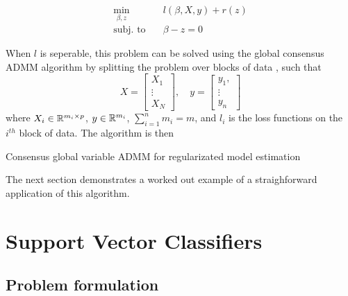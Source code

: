 \documentclass[11pt]{article}
\begin{document}
\begin{equation}
\begin{aligned}
    \min_{\beta, z} \quad & {l(\beta, X, y) + r(z)} \\
    \textrm{subj. to} \quad & \beta - z = 0
\end{aligned}
\end{equation}

When $l$ is seperable, this problem can be solved using the global consensus ADMM algorithm by splitting
the problem over blocks of data \cite{boydistributed}, such that
\[
    X = \begin{bmatrix} X_1 \\ \vdots \\ X_N \end{bmatrix}, \quad
    y = \begin{bmatrix} y_1, \\ \vdots \\ y_n\end{bmatrix}
\]
where $X_i \in \mathbb{R}^{m_i \times p}$, $y \in \mathbb{R}^{m_i}$, $\sum_{i=1}^n m_i = m$, and $l_i$ is 
the loss functions on the $i^{th}$ block of data.
The algorithm is then 

\begin{algorithm}
    \caption{Consensus global variable ADMM for regularizated model estimation}

\end{algorithm}

The next section demonstrates a worked out example of a straighforward application of this algorithm.

\section{Support Vector Classifiers}


\subsection{Problem formulation}
\end{document}
